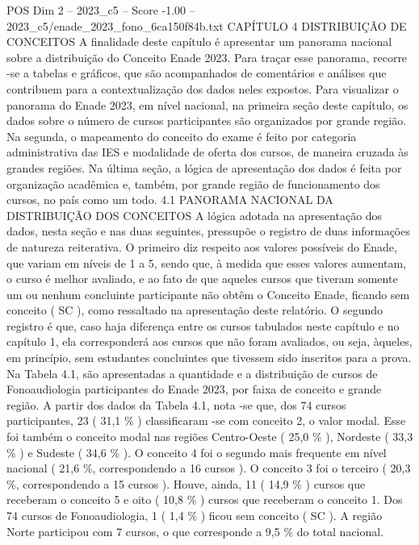 \begin{textsample}{POS Dim 2 – 2023\_c5 – Score -1.00 – 2023\_c5/enade\_2023\_fono\_6ca150f84b.txt}  \label{ex:f2_pos_263}
CAPÍTULO 4 DISTRIBUIÇÃO DE CONCEITOS A finalidade deste capítulo é apresentar um panorama nacional sobre a distribuição do Conceito Enade 2023.
Para traçar esse panorama, recorre -se a tabelas e gráficos, que são acompanhados de comentários e análises que contribuem para a contextualização dos dados neles expostos.
Para visualizar o panorama do Enade 2023, em nível nacional, na primeira seção deste capítulo, os dados sobre o número de cursos participantes são organizados por grande região.
Na segunda, o mapeamento do conceito do exame é feito por categoria administrativa das IES e modalidade de oferta dos cursos, de maneira cruzada às grandes regiões.
Na última seção, a lógica de apresentação dos dados é feita por organização acadêmica e, também, por grande região de funcionamento dos cursos, no país como um todo. 4.1 PANORAMA NACIONAL DA DISTRIBUIÇÃO DOS CONCEITOS A lógica adotada na apresentação dos dados, nesta seção e nas duas seguintes, pressupõe o registro de duas informações de natureza reiterativa.
O primeiro diz respeito aos valores possíveis do Enade, que variam em níveis de 1 a 5, sendo que, à medida que esses valores aumentam, o curso é melhor avaliado, e ao fato de que aqueles cursos que tiveram somente um ou nenhum concluinte participante não obtêm o Conceito Enade, ficando sem conceito ( SC ), como ressaltado na apresentação deste relatório.
O segundo registro é que, caso haja diferença entre os cursos tabulados neste capítulo e no capítulo 1, ela corresponderá aos cursos que não foram avaliados, ou seja, àqueles, em princípio, sem estudantes concluintes que tivessem sido inscritos para a prova.
Na Tabela 4.1, são apresentadas a quantidade e a distribuição de cursos de Fonoaudiologia participantes do Enade 2023, por faixa de conceito e grande região.
A partir dos dados da Tabela 4.1, nota -se que, dos 74 cursos participantes, 23 ( 31,1 \% ) classificaram -se com conceito 2, o valor modal.
Esse foi também o conceito modal nas regiões Centro-Oeste ( 25,0 \% ), Nordeste ( 33,3 \% ) e Sudeste ( 34,6 \% ).
O conceito 4 foi o segundo mais frequente em nível nacional ( 21,6 \%, correspondendo a 16 cursos ).
O conceito 3 foi o terceiro ( 20,3 \%, correspondendo a 15 cursos ).
Houve, ainda, 11 ( 14,9 \% ) cursos que receberam o conceito 5 e oito ( 10,8 \% ) cursos que receberam o conceito 1.
Dos 74 cursos de Fonoaudiologia, 1 ( 1,4 \% ) ficou sem conceito ( SC ).
A região Norte participou com 7 cursos, o que corresponde a 9,5 \% do total nacional.

\end{textsample}

